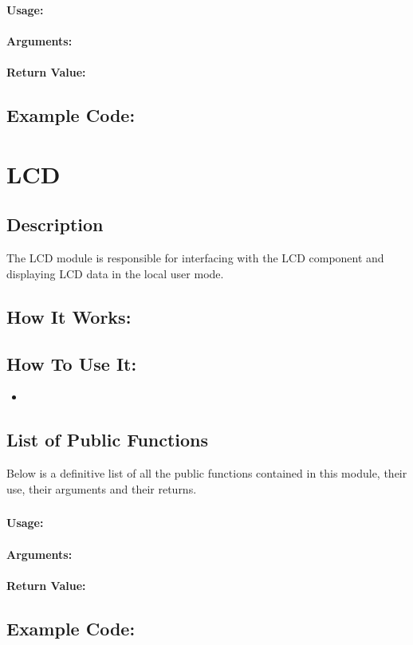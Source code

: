 \documentclass[]{report}
\begin{document}
\subsection{}
\subsubsection{Usage:}

\subsubsection{Arguments:}

\subsubsection{Return Value:}

\section{Example Code:}

\chapter{LCD}
\section{Description}
The LCD module is responsible for interfacing with the LCD component and displaying LCD data in the local user mode.

\section{How It Works:}

\section{How To Use It:}
\begin{itemize}
	\item 
\end{itemize}

\section{List of Public Functions}
Below is a definitive list of all the public functions contained in this module, their use, their arguments and their returns.

\subsection{}
\subsubsection{Usage:}

\subsubsection{Arguments:}

\subsubsection{Return Value:}

\section{Example Code:}
\end{document}
